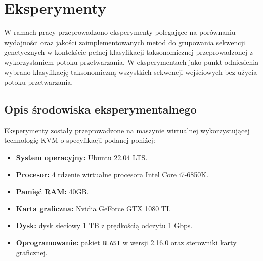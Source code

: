 \cleardoublepage 
\section{Eksperymenty}

    W ramach pracy przeprowadzono eksperymenty polegające na porównaniu wydajności oraz jakości zaimplementowanych metod do grupowania sekwencji genetycznych w kontekście pełnej klasyfikacji taksonomicznej przeprowadzonej z wykorzystaniem potoku przetwarzania. W eksperymentach jako punkt odniesienia wybrano klasyfikację taksonomiczną wszystkich sekwencji wejściowych bez użycia potoku przetwarzania.

    \subsection{Opis środowiska eksperymentalnego}

        Eksperymenty zostały przeprowadzone na maszynie wirtualnej wykorzystującej technologię KVM o specyfikacji podanej poniżej:


            \begin{itemize}
                \item {
                    \textbf{System operacyjny:} Ubuntu 22.04 LTS.
                }
                \item {
                    \textbf{Procesor:} 4 rdzenie wirtualne procesora Intel Core i7-6850K.
                }
                \item {
                    \textbf{Pamięć RAM:} 40GB.
                }
                \item {
                    \textbf{Karta graficzna:} Nvidia GeForce GTX 1080 TI.
                }
                \item {
                    \textbf{Dysk:} dysk sieciowy 1 TB z prędkością odczytu 1 Gbps.
                }
                \item {
                    \textbf{Oprogramowanie:} pakiet \texttt{BLAST} w wersji 2.16.0 oraz sterowniki karty graficznej.
                }
            \end{itemize}

